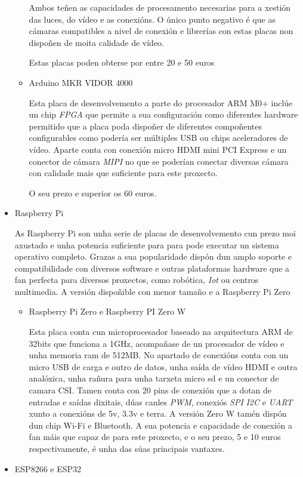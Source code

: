 \begin{itemize}
\begin{itemize}
Ambos teñen as capacidades de procesamento necesarias para a xestión das luces, do vídeo e as conexións. O único punto negativo é que as cámaras compatibles a nivel de conexión e librerías con estas placas non dispoñen de moita calidade de vídeo.

Estas placas poden obterse por entre 20 e 50 euros

        \item Arduino MKR VIDOR 4000

Esta placa de desenvolvemento a parte do procesador ARM M0+ inclúe un chip \emph{FPGA} que permite a sua configuración como diferentes hardware permitido que a placa poda dispoñer de diferentes compoñentes configurables como podería ser múltiples USB ou chips aceleradores de vídeo. Aparte conta con conexión micro HDMI mini PCI Express e un conector de cámara \emph{MIPI} no que se poderían conectar diversas cámara con calidade mais que suficiente para este proxecto.

O seu prezo e superior os 60 euros.
    \end{itemize}
    \item Raspberry Pi

As Raspberry Pi son unha serie de placas de desenvolvemento cun prezo moi axustado e unha potencia suficiente para para pode executar un sistema operativo completo. Grazas a sua popularidade dispón dun amplo soporte e compatibilidade con diversos software e outras plataformas hardware que a fan perfecta para diversos proxectos, como robótica, \emph{Iot} ou centros multimedia.
A versión dispoñible con menor tamaño e a Raspberry Pi Zero
    \begin{itemize}
        \item Raspberry Pi Zero e Raspberry PI Zero W

Esta placa conta cun microprocesador baseado na arquitectura ARM de 32bits que funciona a 1GHz, acompañase de un procesador de vídeo e unha memoria ram de 512MB. No apartado de conexións conta con un micro USB de carga e outro de datos, unha saída de vídeo HDMI e outra analóxica, unha rañura para unha tarxeta micro sd e un conector de camara CSI. Tamen conta con 20 pins de conexión que a dotan de entradas e saídas dixitais, dúas canles \emph{PWM}, conexiós \emph{SPI} \emph{I2C} e \emph{UART} xunto a conexións de 5v, 3.3v e terra. A versión Zero W tamén dispón dun chip Wi-Fi e Bluetooth.
A sua potencia e capacidade de conexión a fan máis que capaz de para este proxecto, e o seu prezo, 5 e 10 euros respectivamente, é unha das súas principais vantaxes.
    \end{itemize}
    \item ESP8266 e ESP32


\end{itemize}
